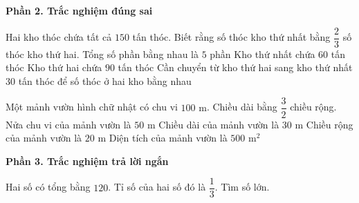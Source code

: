\textbf{Phần 2. Trắc nghiệm đúng sai}

\begin{ex} %
Hai kho thóc chứa tất cả $150$ tấn thóc. Biết rằng số thóc kho thứ nhất bằng $\dfrac{2}{3}$ số thóc kho thứ hai.
\choiceTF
{\True Tổng số phần bằng nhau là $5$ phần}
{\True Kho thứ nhất chứa $60$ tấn thóc}
{\True Kho thứ hai chứa $90$ tấn thóc}
{Cần chuyển từ kho thứ hai sang kho thứ nhất $30$ tấn thóc để số thóc ở hai kho bằng nhau}
\end{ex}

\begin{ex} %
Một mảnh vườn hình chữ nhật có chu vi $100\text{ m}$. Chiều dài bằng $\dfrac{3}{2}$ chiều rộng.
\choiceTF
{\True Nửa chu vi của mảnh vườn là $50\text{ m}$}
{\True Chiều dài của mảnh vườn là $30\text{ m}$}
{\True Chiều rộng của mảnh vườn là $20\text{ m}$}
{Diện tích của mảnh vườn là $500\text{ m}^2$}
\end{ex}

\textbf{Phần 3. Trắc nghiệm trả lời ngắn}

\begin{ex} %
Hai số có tổng bằng $120$. Tỉ số của hai số đó là $\dfrac{1}{3}$. Tìm số lớn.
\end{ex}


